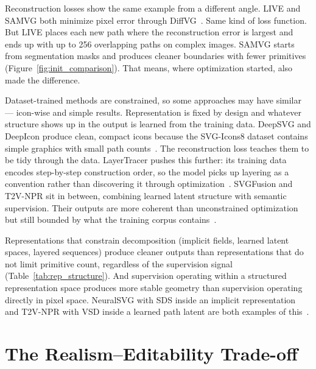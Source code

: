 Reconstruction losses show the same example from a different 
angle. LIVE and SAMVG both minimize pixel error through 
DiffVG~\cite{maLayerwiseImageVectorization2022, 
zhuSAMVGMultistageImage2023}. Same kind of loss function. But LIVE 
places each new path where the reconstruction error is largest 
and ends up with up to 256 overlapping paths on complex images. SAMVG starts from segmentation masks and 
produces cleaner boundaries with fewer primitives 
(Figure~\ref{fig:init_comparison}). 
That means, where optimization started, also made the difference.

Dataset-trained methods are constrained, so some approaches may have similar --- icon-wise and simple results. 
Representation is fixed by design and whatever structure 
shows up in the output is learned from the training data.
DeepSVG and DeepIcon produce clean, compact 
icons because the SVG-Icons8 dataset contains simple graphics 
with small path 
counts~\cite{carlierDeepSVGHierarchicalGenerative2020}. The 
reconstruction loss teaches them to be tidy through the data.
LayerTracer pushes this further: its training data 
encodes step-by-step construction order, so the model picks 
up layering as a convention rather than discovering it through 
optimization~\cite{songLayerTracerCognitiveAlignedLayered2025}. 
SVGFusion and T2V-NPR sit in between, combining learned 
latent structure with semantic supervision. Their outputs are 
more coherent than unconstrained optimization but still 
bounded by what the training corpus 
contains~\cite{xingSVGFusionScalableTexttoSVG2025, 
zhangTexttoVectorGenerationNeural2024}.

Representations that constrain 
decomposition (implicit fields, learned latent spaces, layered 
sequences) produce cleaner outputs than 
representations that do not limit primitive count, 
regardless of the supervision signal 
(Table~\ref{tab:rep_structure}). And supervision operating 
within a structured representation space produces more stable 
geometry than supervision operating directly in pixel space. 
NeuralSVG with SDS inside an implicit representation and 
T2V-NPR with VSD inside a learned path latent are both 
examples of this~\cite{polaczekNeuralSVGImplicitRepresentation2025, 
zhangTexttoVectorGenerationNeural2024}.

\section{The Realism--Editability Trade-off}
\label{sec:tradeoff}

